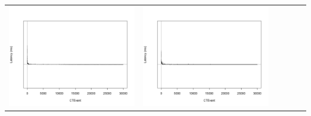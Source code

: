 \begin{table}[htbp]
{\begin{tabular}{l | ccccc}
\begin{minipage}{.15\textwidth}
				\vspace{2pt}
     			 	\includegraphics[width=\linewidth]{images/lat-log-graph/I3}
    				 \end{minipage}
    			   & \begin{minipage}{.15\textwidth}
     			 	
				\vspace{2pt}
     			 	\includegraphics[width=\linewidth]{images/lat-log-graph/I7}
    				 \end{minipage}
    			   &	 \begin{minipage}{.15\textwidth}
     			 	

\end{minipage}
\end{tabular}}
\end{table}

